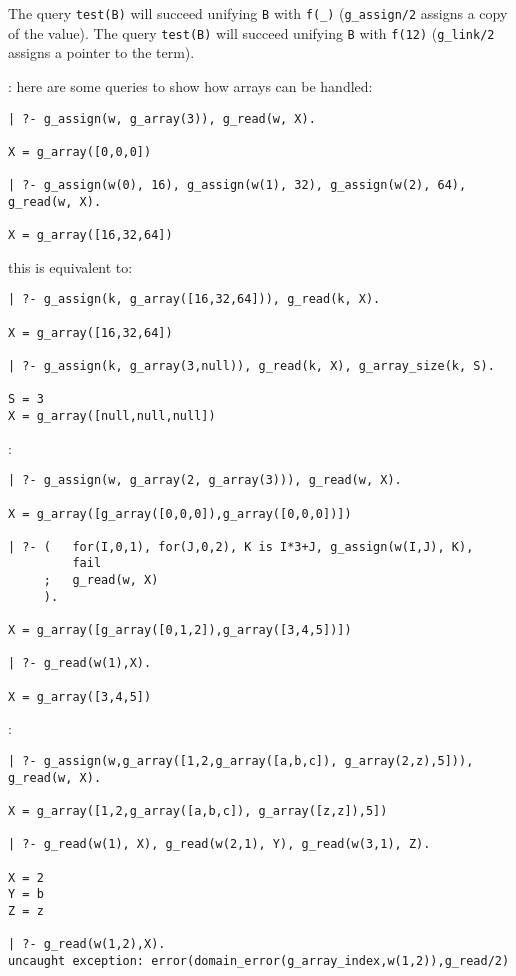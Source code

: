 The query \texttt{test(B)} will succeed unifying \texttt{B} with
\texttt{f(\_)} (\texttt{g\_assign/2} assigns a copy of the value). The query
\texttt{test(B)} will succeed unifying \texttt{B} with \texttt{f(12)}
(\texttt{g\_link/2} assigns a pointer to the term). 

: here are some queries to show how arrays
can be handled:

\begin{Indentation}
\begin{verbatim}
| ?- g_assign(w, g_array(3)), g_read(w, X).

X = g_array([0,0,0])

| ?- g_assign(w(0), 16), g_assign(w(1), 32), g_assign(w(2), 64), g_read(w, X).

X = g_array([16,32,64])
\end{verbatim}
\end{Indentation}

this is equivalent to:

\begin{Indentation}
\begin{verbatim}
| ?- g_assign(k, g_array([16,32,64])), g_read(k, X).

X = g_array([16,32,64])

| ?- g_assign(k, g_array(3,null)), g_read(k, X), g_array_size(k, S).

S = 3
X = g_array([null,null,null])
\end{verbatim}
\end{Indentation}

:

\begin{Indentation}
\begin{verbatim}
| ?- g_assign(w, g_array(2, g_array(3))), g_read(w, X).

X = g_array([g_array([0,0,0]),g_array([0,0,0])])

| ?- (   for(I,0,1), for(J,0,2), K is I*3+J, g_assign(w(I,J), K),
         fail
     ;   g_read(w, X)
     ).

X = g_array([g_array([0,1,2]),g_array([3,4,5])])

| ?- g_read(w(1),X).

X = g_array([3,4,5])
\end{verbatim}
\end{Indentation}

:

\begin{Indentation}
\begin{verbatim}
| ?- g_assign(w,g_array([1,2,g_array([a,b,c]), g_array(2,z),5])), g_read(w, X).

X = g_array([1,2,g_array([a,b,c]), g_array([z,z]),5])

| ?- g_read(w(1), X), g_read(w(2,1), Y), g_read(w(3,1), Z).

X = 2
Y = b
Z = z

| ?- g_read(w(1,2),X).
uncaught exception: error(domain_error(g_array_index,w(1,2)),g_read/2)
\end{verbatim}
\end{Indentation}

